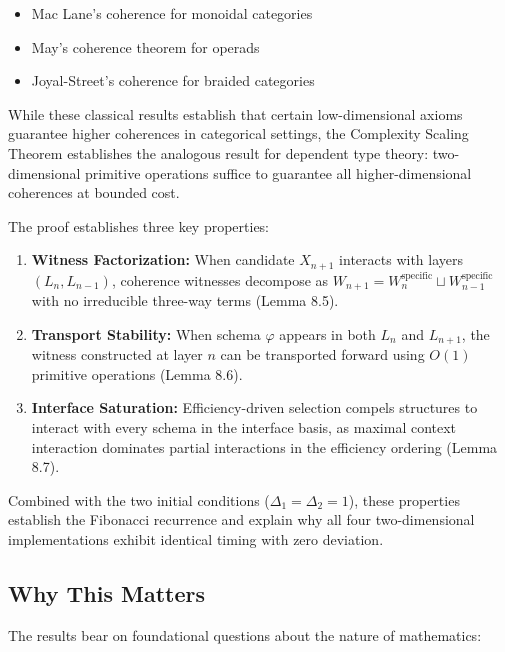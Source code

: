 \documentclass[11pt]{article}
\theoremstyle{definition}
\theoremstyle{remark}
\begin{document}
\begin{itemize}
\item Mac Lane's coherence for monoidal categories \cite{maclane1963natural}
\item May's coherence theorem for operads \cite{may1972geometry}
\item Joyal-Street's coherence for braided categories \cite{joyal1993braided}
\end{itemize}

While these classical results establish that certain low-dimensional axioms guarantee higher coherences
in categorical settings, the Complexity Scaling Theorem establishes the analogous result for
dependent type theory: two-dimensional primitive operations suffice to guarantee all higher-dimensional
coherences at bounded cost.

The proof establishes three key properties:

\begin{enumerate}
\item \textbf{Witness Factorization:} When candidate $X_{n+1}$ interacts with layers $(L_n, L_{n-1})$,
coherence witnesses decompose as $W_{n+1} = W_n^{\text{specific}} \sqcup W_{n-1}^{\text{specific}}$ with
no irreducible three-way terms (Lemma 8.5).

\item \textbf{Transport Stability:} When schema $\varphi$ appears in both $L_n$ and $L_{n+1}$, the
witness constructed at layer $n$ can be transported forward using $O(1)$ primitive operations
(Lemma 8.6).

\item \textbf{Interface Saturation:} Efficiency-driven selection compels structures to interact with
every schema in the interface basis, as maximal context interaction dominates partial interactions
in the efficiency ordering (Lemma 8.7).
\end{enumerate}

Combined with the two initial conditions ($\Delta_1 = \Delta_2 = 1$), these properties establish the
Fibonacci recurrence and explain why all four two-dimensional implementations exhibit identical
timing with zero deviation.

\subsection{Why This Matters}

The results bear on foundational questions about the nature of mathematics:
\end{document}
